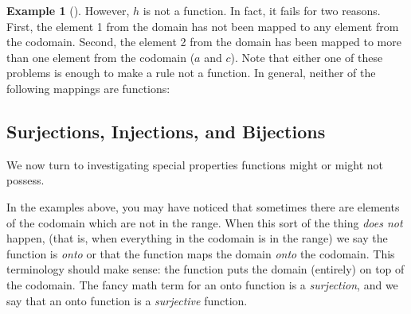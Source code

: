 \documentclass[10pt,]{book}
\theoremstyle{plain}
\theoremstyle{definition}
\newtheorem{example}[theorem]{Example}
\theoremstyle{definition}
\theoremstyle{definition}
\newcounter{figstack}
\newcounter{figindex}
\newlength\fight
\newcommand\pushValignCaptionBottom[5][b]{%
\stepcounter{figstack}%
\expandafter\def\csname %
figalign\romannumeral\value{figstack}\endcsname{#1}%
\expandafter\def\csname %
figtype\romannumeral\value{figstack}\endcsname{#2}%
\expandafter\def\csname %
figwd\romannumeral\value{figstack}\endcsname{#3}%
\expandafter\def\csname %
figcontent\romannumeral\value{figstack}\endcsname{#4}%
\expandafter\def\csname %
figcap\romannumeral\value{figstack}\endcsname{#5}%
\setbox0=\hbox{%
\begin{#2}{#3}#4\end{#2}}%
\ifdim\dimexpr\ht0+\dp0\relax>\fight\global\setlength{\fight}{%
\dimexpr\ht0+\dp0\relax}\fi%
}
\newcommand\popValignCaptionBottom{%
\setcounter{figindex}{0}%
\hfill%
\whiledo{\value{figindex}<\value{figstack}}{%
\stepcounter{figindex}%
\def\tmp{\csname figwd\romannumeral\value{figindex}\endcsname}%
\begin{\csname figtype\romannumeral\value{figindex}\endcsname}[t]{\tmp}%
\centering%
\stackinset{c}{}%
{\csname figalign\romannumeral\value{figindex}\endcsname}{}%
{\csname figcontent\romannumeral\value{figindex}\endcsname}%
{\rule{0pt}{\fight}}\par%
\csname figcap\romannumeral\value{figindex}\endcsname%
\end{\csname figtype\romannumeral\value{figindex}\endcsname}%
\hfill%
}%
\setcounter{figstack}{0}%
\setlength{\fight}{0pt}%
\hfill%
}
\begin{document}
\begin{example}[]
\par

          However, \(h\) is not a function. In fact, it fails for two reasons. First, the element 1 from the domain has not been mapped to any element from the codomain. Second, the element 2 from the domain has been mapped to more than one element from the codomain (\(a\) and \(c\)). Note that either one of these problems is enough to make a rule not a function. In general, neither of the following mappings are functions:
\leavevmode%
\end{example}
\typeout{************************************************}
\typeout{************************************************}
\subsection[Surjections, Injections, and Bijections]{Surjections, Injections, and Bijections}\label{subsec_surj-inj-bij}

      We now turn to investigating special properties functions might or might not possess.
\par

      In the examples above, you may have noticed that sometimes there are elements of the codomain which are not in the range. When this sort of the thing \emph{does not} happen, (that is, when everything in the codomain is in the range) we say the function is \emph{onto} or that the function maps the domain \emph{onto} the codomain. This terminology should make sense: the function puts the domain (entirely) on top of the codomain. The fancy math term for an onto function is a \emph{surjection}, and we say that an onto function is a \emph{surjective} function.
\par
\end{document}
